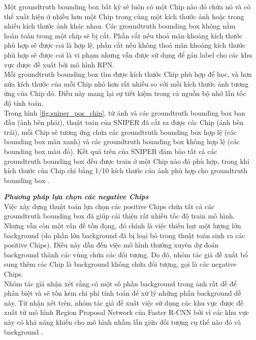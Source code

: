 {    \noindent
    Một groundtruth  bounding box  bất kỳ sẽ luôn có một Chip nào đó chứa nó và có thể xuất hiện ở nhiều hơn một Chip trong cùng một kích thước ảnh hoặc trong nhiều kích thước ảnh khác nhau.
    Các groundtruth  bounding box  không nằm hoàn toàn trong một chip sẽ bị cắt.
    Phần cắt nếu thoả mãn khoảng kích thước phù hợp sẽ được coi là hợp lệ, phần cắt nếu không thoả mãn khoảng kích thước phù hợp sẽ được coi là vi phạm nhưng vẫn được sử dụng để gán label cho các khu vực được đề xuất bởi mô hình RPN. \\
    Mỗi groundtruth  bounding box  tìm được kích thước Chip phù hợp để học, và hơn nữa kích thước của mỗi Chip nhỏ hơn rất nhiều so với mỗi kích thước ảnh tương ứng của Chip đó.
    Điều này mang lại sự tiết kiệm trong cả nguồn bộ nhớ lẫn tốc độ tính toán. \\
    Trong hình \ref{fig:sniper_pos_chip}, từ ảnh và các groundtruth  bounding box  ban đầu (ảnh bên phải), thuật toán của SNIPER  đã cắt ra được các Chip (ảnh bên trái), mỗi Chip sẽ tương ứng chứa các groundtruth  bounding box  hợp lệ (các bounding box  màu xanh) và các groundtruth  bounding box  không hợp lệ (các bounding box  màu đỏ).
    Kết quả trên của SNIPER  đảm bảo tất cả các groundtruth  bounding box  đều được train ở một Chip nào đó phù hợp, trong khi kích thước của Chip chỉ bằng 1/10 kích thước của ảnh phù hợp cho groundtruth  bounding box .

    \noindent
    \textbf{\textit{Phương pháp lựa chọn các negative Chips}} \\
    Việc xây dựng thuật toán lựa chọn các positive Chips chứa tất cả các groundtruth  bounding box  đã giúp cải thiện rất nhiều tốc độ train mô hình.
    Nhưng vẫn còn một vấn đề tồn đọng, đó chính là việc thiếu hụt một lượng lớn background  (do phần lớn background  đã bị loại bỏ trong thuật toán sinh ra các positive Chips).
    Điều này dẫn đến việc mô hình thường xuyên dự đoán background  thành các vùng chứa các đối tượng.
    Do đó, nhóm tác giả đề xuất bổ sung thêm các Chip là background  không chứa đối tượng, gọi là các negative Chips. \\
    Nhóm tác giả nhận xét rằng có một số phần background  trong ảnh rất dễ để phân biệt và sẽ tốn kém chi phí tính toán để xử lý những phần background  dễ này.
    Từ nhận xét trên, nhóm tác giả đề xuất việc sử dụng các khu vực được đề xuất từ mô hình Region Proposal Network của Faster R-CNN bởi vì các khu vực này có khả năng khiến cho mô hình nhầm lẫn giữa đối tượng cụ thể nào đó và background .

}
